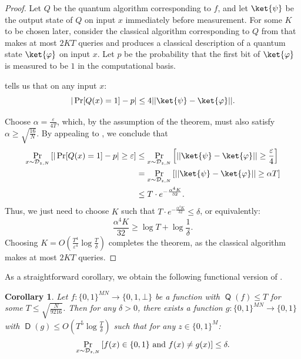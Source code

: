 \documentclass[11pt]{article}%
\newtheorem{corollary}[theorem]{Corollary}
\newcommand{\eps}{\varepsilon}
\DeclareMathOperator{\D}{\mathsf{D}}
\DeclareMathOperator{\Q}{\mathsf{Q}}
\begin{document}
\begin{proof}
Let $Q$ be the quantum algorithm corresponding to $f$, and let $\ket{\psi}$ be the output state of $Q$ on input $x$ immediately before measurement. For some $K$ to be chosen later, consider the classical algorithm corresponding to $Q$ from  that makes at most $2KT$ queries and produces a classical description of a quantum state $\ket{\varphi}$ on input $x$. Let $p$ be the probability that the first bit of $\ket{\varphi}$ is measured to be $1$ in the computational basis.

\cite[Lemma 3.6]{BV97} tells us that on any input $x$:
\[
|\Pr[Q(x) = 1] - p| \le 4|| \ket{\psi} - \ket{\varphi}||.
\]

Choose $\alpha = \frac{\eps}{4T}$, which, by the assumption of the theorem, must also satisfy $\alpha \ge \sqrt{\frac{16}{N}}$. By appealing to , we conclude that
\begin{align*}
\Pr_{x \sim \mathcal{D}_{z,N}}\left[|\Pr[Q(x) = 1] - p| \ge \eps\right] &\le \Pr_{x \sim \mathcal{D}_{z,N}}\left[|| \ket{\psi} - \ket{\varphi}|| \ge \frac{\eps}{4} \right]\\
&= \Pr_{x \sim \mathcal{D}_{z,N}}\left[|| \ket{\psi} - \ket{\varphi}|| \ge \alpha T \right]\\
&\le T \cdot e^{-\frac{\alpha^4 K}{32}}.
\end{align*}
Thus, we just need to choose $K$ such that $T \cdot e^{-\frac{\alpha^4 K}{32}} \le \delta$, or equivalently:
\[
\frac{\alpha^4 K}{32} \ge \log T + \log \frac{1}{\delta}.
\]
Choosing $K = O\left(\frac{T^4}{\eps^4} \log \frac{T}{\delta}\right)$ completes the theorem, as the classical algorithm makes at most $2KT$ queries.
\end{proof}

As a straightforward corollary, we obtain the following functional version of .

\begin{corollary}
\label{cor:sparse_aa_functional}
Let $f: \{0,1\}^{MN} \to \{0,1,\bot\}$ be a function with $\Q(f) \le T$ for some $T \le \sqrt{\frac{N}{9216}}$. Then for any $\delta > 0$, there exists a function $g: \{0,1\}^{MN} \to \{0,1\}$ with $\D(g) \le O\left(T^5 \log \frac{T}{\delta}\right)$ such that for any $z \in \{0,1\}^M$:
\[
\Pr_{x \sim \mathcal{D}_{z,N}}\left[f(x) \in \{0,1\} \text{\normalfont{ and }} f(x) \neq g(x)\right] \le \delta.
\]
\end{corollary}
\end{document}
